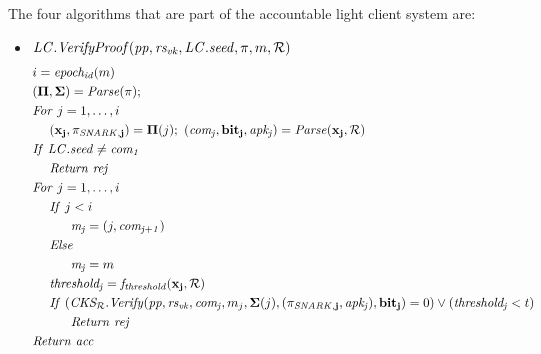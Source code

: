 \noindent The four algorithms that are part of the accountable light client system are: 
\begin{itemize}
\item $\mathit{LC.VerifyProof}(\mathit{pp}, \mathit{rs_{\mathit{vk}}}, \mathit{LC.seed}, \pi, m, \mathcal{R})$
\begin{align*}
& i = \mathit{epoch_{id}}(m) \\
& (\mathbf{\Pi}, \mathbf{\Sigma}) = \mathit{Parse}(\pi);  \\
& \mathit{For} \ j = 1, \ldots, i \\
& \ \ \ \ (\mathbf{x_j}, \mathbf{\pi_{\mathit{SNARK},j}}) = \mathbf{\Pi}(j); \ (\mathit{com_j}, \mathbf{bit_j}, \mathit{apk_j}) = \mathit{Parse}(\mathbf{x_j}, \mathcal{R}) \\
& \mathit{If} \ \mathit{LC.seed} \neq \mathit{com_1} \\
& \ \ \ \ \mathit{Return} \ \mathit{rej} \\
& \mathit{For} \ j = 1, \ldots, i \\
& \ \ \ \ \mathit{If} \ j < i\\
& \ \ \ \ \ \ \ \ \ \mathit{m_j} = (j, \mathit{com_{j+1}}) \\
& \ \ \ \ \mathit{Else}\\
& \ \ \ \ \ \ \ \ \ \mathit{m_j} = m \\
& \ \ \ \ \mathit{threshold_j} = \mathit{f_{\mathit{threshold}}}(\mathbf{x_j}, \mathcal{R})  \\
& \ \ \ \ \mathit{If} \ (\mathit{CKS_{\mathcal{R}}.Verify}(\mathit{pp},  \mathit{rs_{\mathit{vk}}}, \mathit{com_j}, m_j,  \mathbf{\Sigma}(j), (\mathbf{\pi_{\mathit{SNARK},j}},\mathit{apk_j}), 
\mathbf{bit_j}) = 0)  \vee (\mathit{threshold_j} < t) \\
& \ \ \ \ \ \ \ \ \ \mathit{Return} \ \mathit{rej} \\
& \mathit{Return} \ \mathit{acc} \\
\end{align*}
\end{itemize}

